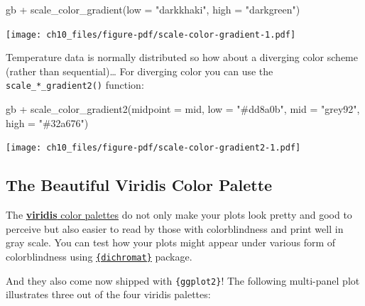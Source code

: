 \documentclass[
  letterpaper,
  DIV=11,
  numbers=noendperiod]{scrreprt}
\newenvironment{Shaded}{\begin{snugshade}}{\end{snugshade}}
\newcommand{\AttributeTok}[1]{\textcolor[rgb]{0.40,0.45,0.13}{#1}}
\newcommand{\FunctionTok}[1]{\textcolor[rgb]{0.28,0.35,0.67}{#1}}
\newcommand{\NormalTok}[1]{\textcolor[rgb]{0.00,0.23,0.31}{#1}}
\newcommand{\SpecialCharTok}[1]{\textcolor[rgb]{0.37,0.37,0.37}{#1}}
\newcommand{\StringTok}[1]{\textcolor[rgb]{0.13,0.47,0.30}{#1}}
\begin{document}
\begin{Shaded}
\begin{Highlighting}[]
\NormalTok{gb }\SpecialCharTok{+} \FunctionTok{scale\_color\_gradient}\NormalTok{(}\AttributeTok{low =} \StringTok{"darkkhaki"}\NormalTok{,}
                          \AttributeTok{high =} \StringTok{"darkgreen"}\NormalTok{)}
\end{Highlighting}
\end{Shaded}

\texttt{[image: ch10\_files/figure-pdf/scale-color-gradient-1.pdf]}

Temperature data is normally distributed so how about a diverging color
scheme (rather than sequential)\ldots{} For diverging color you can use
the \texttt{scale\_*\_gradient2()} function:

\begin{Shaded}
\begin{Highlighting}[]
\NormalTok{gb }\SpecialCharTok{+} \FunctionTok{scale\_color\_gradient2}\NormalTok{(}\AttributeTok{midpoint =}\NormalTok{ mid, }\AttributeTok{low =} \StringTok{"\#dd8a0b"}\NormalTok{,}
                           \AttributeTok{mid =} \StringTok{"grey92"}\NormalTok{, }\AttributeTok{high =} \StringTok{"\#32a676"}\NormalTok{)}
\end{Highlighting}
\end{Shaded}

\texttt{[image: ch10\_files/figure-pdf/scale-color-gradient2-1.pdf]}

\subsection{The Beautiful Viridis Color
Palette}\label{the-beautiful-viridis-color-palette}

The
\href{https://sjmgarnier.github.io/viridis/articles/intro-to-viridis.html}{\textbf{viridis}
color palettes} do not only make your plots look pretty and good to
perceive but also easier to read by those with colorblindness and print
well in gray scale. You can test how your plots might appear under
various form of colorblindness using
\href{https://cran.r-project.org/web/packages/dichromat/index.html}{\texttt{\{dichromat\}}}
package.

And they also come now shipped with \texttt{\{ggplot2\}}! The following
multi-panel plot illustrates three out of the four viridis palettes:
\end{document}
